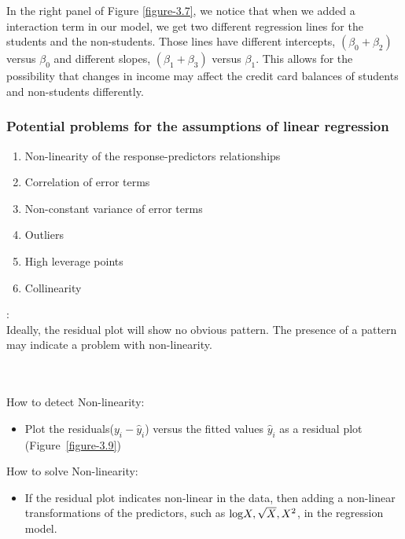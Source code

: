     \documentclass[12pt,fleqn,a4paper]{article}%
\theoremstyle{definition}
\theoremstyle{plain}
\numberwithin{equation}{section}
\begin{document}
In the right panel of Figure \ref{figure-3.7}, we notice that when we added a interaction term in our model, we get two different regression lines for the students and the non-students.
Those lines have different intercepts, $(\beta_{0}+\beta_{2})$ versus $\beta_{0}$ and different slopes, $(\beta_{1}+\beta_{3})$ versus $\beta_{1}$.
This allows for the possibility that changes in income may affect the credit card balances of students and non-students differently.


\subsubsection{\textbf{Potential problems for the assumptions of linear regression}}
\begin{enumerate}
\item Non-linearity of the response-predictors relationships
\item Correlation of error terms
\item Non-constant variance of error terms
\item Outliers
\item High leverage points
\item Collinearity 
\end{enumerate}

\textbf{\color{blue}{1. Non-linearity of the Data}}:\\
Ideally, the residual plot will show no obvious pattern. 
The presence of a pattern may indicate a problem with non-linearity.

~\\~\\
How to detect Non-linearity:
\begin{itemize}
\item Plot the residuals($y_{i}-\hat{y}_{i}$) versus the fitted values $\hat{y}_{i}$ as a residual plot (Figure~\ref{figure-3.9})
\end{itemize}

How to solve Non-linearity:
\begin{itemize}
\item If the residual plot indicates non-linear in the data, then adding a non-linear transformations of the predictors, such as ${\rm log}X, \sqrt{X}, X^{2}$, in the regression model.
\end{itemize}
\end{document}
